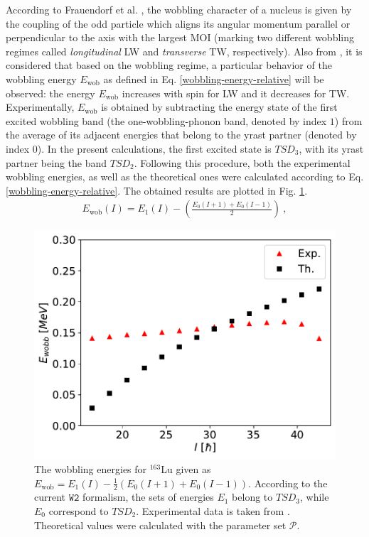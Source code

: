 \documentclass[myclassdoc,debug]{rjparticle}
\begin{document}
According to Frauendorf et al. \cite{frauendorf2014transverse}, the wobbling character of a nucleus is given by the coupling of the odd particle which aligns its angular momentum parallel or perpendicular to the axis with the largest MOI (marking two different wobbling regimes called \emph{longitudinal} LW and \emph{transverse} TW, respectively). Also from \cite{frauendorf2014transverse}, it is considered that based on the wobbling regime, a particular behavior of the wobbling energy $E_\text{wob}$ as defined in Eq. \ref{wobbling-energy-relative} will be observed: the energy $E_\text{wob}$ increases with spin for LW and it decreases for TW. Experimentally, $E_\text{wob}$ is obtained by subtracting the energy state of the first excited wobbling band (the one-wobbling-phonon band, denoted by index $1$) from the average of its adjacent energies that belong to the yrast partner (denoted by index $0$). In the present calculations, the first excited state is $TSD_3$, with its yrast partner being the band $TSD_2$. Following this procedure, both the experimental wobbling energies, as well as the theoretical ones were calculated according to Eq. \ref{wobbling-energy-relative}. The obtained results are plotted in Fig. \ref{wobbling-energies_th_exp}.
\begin{align}
    E_\text{wob}(I)=E_{1}(I)-\left(\frac{E_0(I+1)+E_0(I-1)}{2}\right)\ ,
    \label{wobbling-energy-relative}
\end{align}

\begin{figure}
    \centering
    \includegraphics[scale=0.4]{figs/wobbling_energy_ThExp.pdf}
    \caption{The wobbling energies for $^{163}$Lu given as $E_\text{wob}=E_1(I)-\frac{1}{2}(E_0(I+1)+E_0(I-1))$. According to the current $\texttt{W2}$ formalism, the sets of energies $E_1$ belong to $TSD_3$, while $E_0$ correspond to $TSD_2$. Experimental data is taken from \cite{reich2010nuclear}. Theoretical values were calculated with the parameter set $\mathcal{P}$.}
    \label{wobbling-energies_th_exp}
\end{figure}
\end{document}
